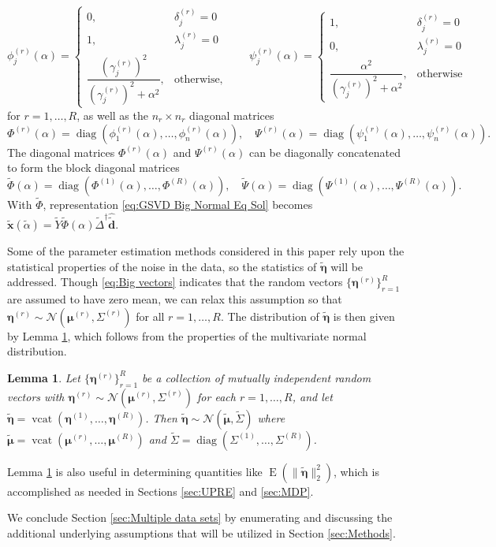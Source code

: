 \documentclass[12pt]{article}
\newcommand{\dVec}{\mathbf{d}}	%
\newcommand{\xVec}{\mathbf{x}}	%
\newcommand{\pinv}[1]{{#1}^\dagger}	%
\DeclareMathOperator{\diag}{diag}	%
\DeclareMathOperator{\vcat}{vcat}	%
\newcommand{\regparam}{\alpha}  %
\newcommand{\regparamBig}{\widetilde{\regparam}}   %
\newcommand{\xBig}{\widetilde{\xVec}}	%
\newcommand{\dBig}{\widetilde{\dVec}}	%
\newcommand{\filt}{\phi}
\newcommand{\mfilt}{\psi}
\newcommand{\noise}{\eta}	%
\newcommand{\noiseVec}{\bm{\noise}}	%
\DeclareMathOperator{\E}{E}	%
\newcommand{\svd}[1]{\widehat{#1}}	%
\newtheorem{lemma}{Lemma}[section]
\begin{document}
\[\filt_j^{(r)}\left(\regparam\right) = \begin{cases}
0, & \delta_j^{(r)} = 0 \\
1, & \lambda_j^{(r)} = 0 \\
\dfrac{\left(\gamma_j^{(r)}\right)^2}{\left(\gamma_j^{(r)}\right)^2 + \regparam^2}, & \text{otherwise,}
\end{cases} \qquad
\mfilt_j^{(r)}\left(\regparam\right) = \begin{cases}
1, & \delta_j^{(r)} = 0 \\
0, & \lambda_j^{(r)} = 0 \\
\dfrac{\regparam^2}{\left(\gamma_j^{(r)}\right)^2 + \regparam^2}, & \text{otherwise}
\end{cases}\]
for $r = 1,\ldots,R$, as well as the $n_r \times n_r$ diagonal matrices
\[\Phi^{(r)}(\regparam) = \diag\left(\filt_1^{(r)}(\regparam),\ldots,\filt_n^{(r)}(\regparam)\right), \quad \Psi^{(r)}(\regparam) = \diag\left(\mfilt_1^{(r)}(\regparam),\ldots,\mfilt_n^{(r)}(\regparam)\right).\]
The diagonal matrices $\Phi^{(r)}(\regparam)$ and $\Psi^{(r)}(\regparam)$ can be diagonally concatenated to form the block diagonal matrices
\[\widetilde{\Phi}(\regparam) = \diag\left(\Phi^{(1)}(\regparam),\ldots,\Phi^{(R)}(\regparam)\right), \quad \widetilde{\Psi}(\regparam) = \diag\left(\Psi^{(1)}(\regparam),\ldots,\Psi^{(R)}(\regparam)\right).\]
With $\widetilde{\Phi}$, representation \eqref{eq:GSVD Big Normal Eq Sol} becomes $\xBig(\regparamBig) = \widetilde{Y}\widetilde{\Phi}(\regparam)\pinv{\widetilde{\Delta}}\svd{\dBig}$.

Some of the parameter estimation methods considered in this paper rely upon the statistical properties of the noise in the data, so the statistics of $\widetilde{\noiseVec}$ will be addressed. Though \eqref{eq:Big vectors} indicates that the random vectors $\{\noiseVec^{(r)}\}_{r=1}^R$ are assumed to have zero mean, we can relax this assumption so that $\noiseVec^{(r)} \sim \mathcal{N}(\bm{\mu}^{(r)},\Sigma^{(r)})$ for all $r = 1,\ldots,R$. The distribution of $\widetilde{\noiseVec}$ is then given by Lemma \ref{lem:Concatenation of Normal Noise}, which follows from the properties of the multivariate normal distribution. 
\begin{lemma}
\label{lem:Concatenation of Normal Noise}
Let $\{\noiseVec^{(r)}\}_{r=1}^R$ be a collection of mutually independent random vectors with $\noiseVec^{(r)} \sim \mathcal{N}(\bm{\mu}^{(r)},\Sigma^{(r)})$ for each $r = 1,\ldots,R$, and let $\widetilde{\noiseVec} = \vcat(\noiseVec^{(1)},\ldots,\noiseVec^{(R)})$. Then $\widetilde{\noiseVec} \sim \mathcal{N}(\widetilde{\bm{\mu}},\widetilde{\Sigma})$ where $\widetilde{\bm{\mu}} = \vcat(\bm{\mu}^{(r)},\ldots,\bm{\mu}^{(R)})$ and $\widetilde{\Sigma} = \diag(\Sigma^{(1)},\ldots,\Sigma^{(R)})$.
\end{lemma}
\noindent Lemma \ref{lem:Concatenation of Normal Noise} is also useful in determining quantities like $\E(\|\widetilde{\noiseVec}\|_2^2)$, which is accomplished as needed in Sections \ref{sec:UPRE} and \ref{sec:MDP}. \par
We conclude Section \ref{sec:Multiple data sets} by enumerating and discussing the additional underlying assumptions that will be utilized in Section \ref{sec:Methods}.
\end{document}
